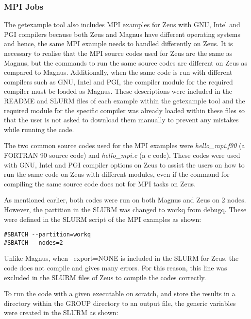 \subsubsection{MPI Jobs}

The getexample tool also includes MPI examples for Zeus with GNU, Intel and PGI compilers because both Zeus and Magnus have different operating systems 
and hence, the same MPI example needs to handled differently on Zeus. It is necessary to realise that the MPI source codes used for Zeus are the same
as Magnus, but the commands to run the same source codes are different on Zeus as compared to Magnus. Additionally, when the same code is run 
with different compilers such as GNU, Intel and PGI, the compiler module for the required compiler must be loaded as Magnus. These descriptions were
included in the README and SLURM files of each example within the getexample tool and the required module for the specific compiler was already loaded 
within these files so that the user is not asked to download them manually to prevent any mistakes while running the code.

The two common source codes used for the MPI examples were \emph{hello\_mpi.f90} (a FORTRAN 90 source code) and \emph{hello\_mpi.c} (a c code). These 
codes were used with GNU, Intel and PGI compiler options on Zeus to assist the users on how to run the same code on Zeus with different modules, even if
the command for compiling the same source code does not for MPI tasks on Zeus.

As mentioned earlier, both codes were run on both Magnus and Zeus on 2 nodes. However, the partition in the SLURM was changed to workq from debugq.
These were defined in the SLURM script of the MPI examples as shown: 

\begin{tcolorbox}
\begin{Verbatim}[fontsize=\scriptsize]
#SBATCH --partition=workq
#SBATCH --nodes=2
\end{Verbatim}
\end{tcolorbox}

Unlike Magnus, when --export=NONE is included in the SLURM for Zeus, the code does not compile and gives many errors. For this reason, this line was
excluded in the SLURM files of Zeus to compile the codes correctly.

To run the code with a given executable on scratch, and store the results in a directory within the GROUP directory to an output file, the generic 
variables were created in the SLURM as shown:

